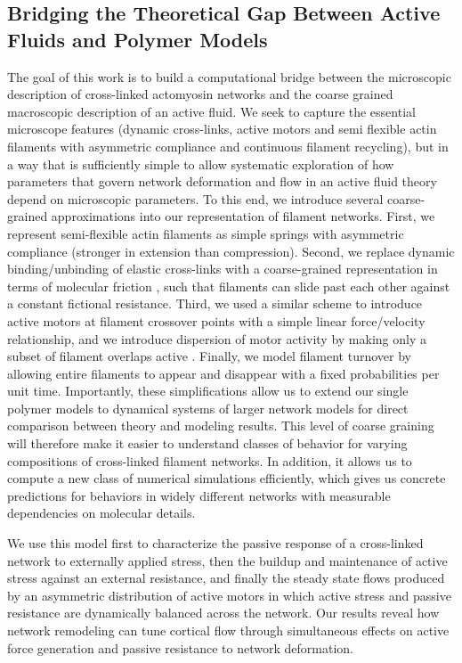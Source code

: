 \subsection{Bridging the Theoretical Gap Between Active Fluids and Polymer Models}  The goal of this work is to build a computational bridge between the microscopic description of cross-linked actomyosin networks and the coarse grained macroscopic description of an active fluid.  We seek to capture the essential microscope features (dynamic cross-links, active motors and semi flexible actin filaments with asymmetric compliance and continuous filament recycling), but in a way that is sufficiently simple to allow systematic exploration of how parameters that govern network deformation and flow in an active fluid theory depend on microscopic parameters. To this end, we introduce several coarse-grained approximations into our representation of filament networks. First, we represent semi-flexible actin filaments as simple springs with asymmetric compliance (stronger in extension than compression). Second, we replace  dynamic binding/unbinding of elastic cross-links with a coarse-grained representation in terms of molecular friction \cite{theo_friction,theo_frictionSam,theo_molefric}, such that filaments can slide past each other against a constant fictional resistance. Third, we used a similar scheme to introduce active motors at filament crossover points with a simple linear force/velocity relationship, and we introduce dispersion of motor activity by making only a subset of filament overlaps active \cite{theo_frictionShila}.  Finally, we model filament turnover by allowing entire filaments to appear and disappear with a fixed probabilities per unit time. Importantly, these simplifications allow us to extend our single polymer models to dynamical systems of larger network models for direct comparison between theory and modeling results. This level of coarse graining will therefore make it easier to understand classes of behavior for varying compositions of cross-linked filament networks. In addition, it allows us to compute a new class of numerical simulations efficiently, which gives us concrete predictions for behaviors in widely different networks with measurable dependencies on molecular details. 

We use this model first to characterize the passive response of a cross-linked network to externally applied stress, then the buildup and maintenance of active stress against an external resistance, and finally the steady state flows produced by an asymmetric distribution of active motors in which active stress and passive resistance are dynamically balanced across the network.  Our results reveal how network remodeling can tune cortical flow through simultaneous effects on active force generation and passive resistance to network deformation. 
